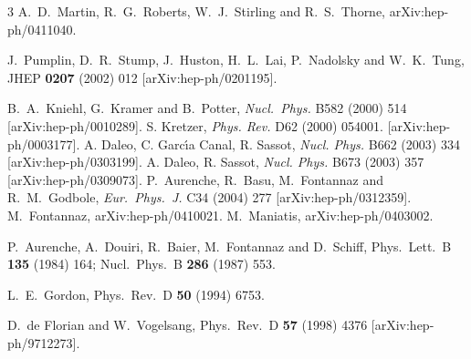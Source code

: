 \documentclass[superscriptaddress,showkeys,showpacs]{revtex4}
\begin{document}
\begin{thebibliography}{3}
A.~D.~Martin, R.~G.~Roberts, W.~J.~Stirling and R.~S.~Thorne,
arXiv:hep-ph/0411040.

J.~Pumplin, D.~R.~Stump, J.~Huston, H.~L.~Lai, P.~Nadolsky and W.~K.~Tung,
JHEP {\bf 0207} (2002) 012
[arXiv:hep-ph/0201195].


B.~A.~Kniehl, G.~Kramer and B.~Potter,
{\em Nucl.\ Phys.} {B582} (2000) 514 [arXiv:hep-ph/0010289].
 S. Kretzer, {\em Phys. Rev.} D62 (2000) 054001.
[arXiv:hep-ph/0003177].
 A. Daleo, C. Garc\'{\i}a Canal, R. Sassot, {\em Nucl. Phys.} 
B662 (2003) 334 [arXiv:hep-ph/0303199].
 A. Daleo,  R. Sassot, {\em Nucl. Phys.} B673 (2003) 357
[arXiv:hep-ph/0309073].
P.~Aurenche, R.~Basu, M.~Fontannaz and R.~M.~Godbole,
{\em Eur.\ Phys.\ J.} {C34} (2004) 277
[arXiv:hep-ph/0312359].
M.~Fontannaz,
arXiv:hep-ph/0410021.
M.~Maniatis,
arXiv:hep-ph/0403002.


P.~Aurenche, A.~Douiri, R.~Baier, M.~Fontannaz and D.~Schiff,
Phys.\ Lett.\ B {\bf 135} (1984) 164; Nucl.\ Phys.\ B {\bf 286} (1987) 553.


L.~E.~Gordon,
Phys.\ Rev.\ D {\bf 50} (1994) 6753.

D.~de Florian and W.~Vogelsang,
Phys.\ Rev.\ D {\bf 57} (1998) 4376
[arXiv:hep-ph/9712273].



\end{thebibliography}
\end{document}
